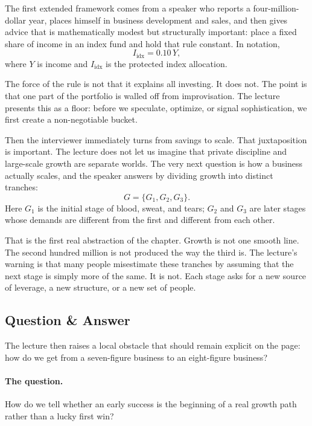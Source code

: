 The first extended framework comes from a speaker who reports a four-million-dollar year, places himself in business development and sales, and then gives advice that is mathematically modest but structurally important: place a fixed share of income in an index fund and hold that rule constant. In notation,
\begin{equation}
I_{\mathrm{idx}} = 0.10\,Y,
\end{equation}
where $Y$ is income and $I_{\mathrm{idx}}$ is the protected index allocation.

The force of the rule is not that it explains all investing. It does not. The point is that one part of the portfolio is walled off from improvisation. The lecture presents this as a floor: before we speculate, optimize, or signal sophistication, we first create a non-negotiable bucket.

Then the interviewer immediately turns from savings to scale. That juxtaposition is important. The lecture does not let us imagine that private discipline and large-scale growth are separate worlds. The very next question is how a business actually scales, and the speaker answers by dividing growth into distinct tranches:
\begin{equation}
G=\{G_1,G_2,G_3\}.
\end{equation}
Here $G_1$ is the initial stage of blood, sweat, and tears; $G_2$ and $G_3$ are later stages whose demands are different from the first and different from each other.

That is the first real abstraction of the chapter. Growth is not one smooth line. The second hundred million is not produced the way the third is. The lecture's warning is that many people misestimate these tranches by assuming that the next stage is simply more of the same. It is not. Each stage asks for a new source of leverage, a new structure, or a new set of people.

\subsection{Question \& Answer}

The lecture then raises a local obstacle that should remain explicit on the page: how do we get from a seven-figure business to an eight-figure business?

\paragraph{The question.}
How do we tell whether an early success is the beginning of a real growth path rather than a lucky first win?

